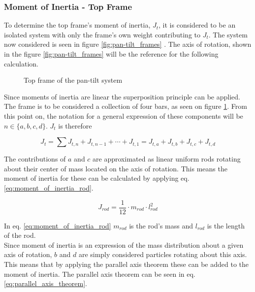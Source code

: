 \documentclass[../../main]{subfiles}
\begin{document}
\subsubsection{Moment of Inertia - Top Frame}
\label{sec:Top_frame_inertia}
To determine the top frame's moment of inertia, $J_{t}$, it is considered to be an isolated system with only the frame's own weight contributing to $J_{t}$. The system now considered is seen in figure \ref{fig:pan-tilt_frames} . The axis of rotation, shown in the figure \ref{fig:pan-tilt_frames}  will be the reference for the following calculation.\\

\begin{figure}[H]
  \centering
  
  \caption{Top frame of the pan-tilt system}
  \label{fig:TopFrame}
\end{figure}

Since moments of inertia are linear the superposition principle can be applied. The frame is to be considered a collection of four bars, as seen on figure \ref{fig:TopFrame}. From this point on, the notation for a general expression of these components will be $n \in \{a,b,c,d\}$. $J_t$ is therefore 

\begin{equation}
  \label{eq:Top_frame_total_inertia_formula}
  J_t = \sum J_{t,n} + J_{t,n-1} + \dotsb + J_{t,1} = J_{t,a} + J_{t,b} + J_{t,c} + J_{t,d}
\end{equation}

The contributions of $a$ and $c$ are approximated as linear uniform rods rotating about their center of mass located on the axis of rotation. This means the moment of inertia for these can be calculated by applying eq. \eqref{eq:moment_of_inertia_rod}.

\begin{equation}
  \label{eq:moment_of_inertia_rod}
  J_{rod}=\frac{1}{12}\cdot m_{rod} \cdot l_{rod}^2
\end{equation}

In eq. \eqref{eq:moment_of_inertia_rod} $m_{rod}$ is the rod's mass and $l_{rod}$ is the length of the rod.
\\

Since moment of inertia is an expression of the mass distribution about a given axis of rotation, $b$ and $d$ are simply considered particles rotating about this axis. This means that by applying the parallel axis theorem these can be added to the moment of inertia. The parallel axis theorem can be seen in eq. \eqref{eq:parallel_axis_theorem}.
\end{document}
